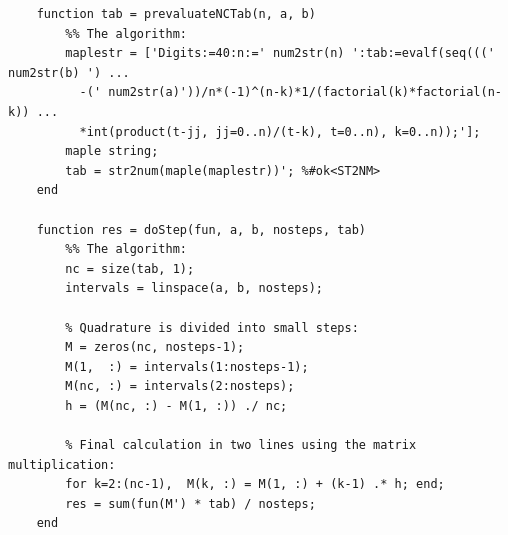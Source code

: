 \documentclass[12pt,twoside,a4paper]{article}
\numberwithin{equation}{subsection}
\numberwithin{figure}{subsection}
\begin{document}
\begin{lstlisting}
	function tab = prevaluateNCTab(n, a, b)
	    %% The algorithm:
	    maplestr = ['Digits:=40:n:=' num2str(n) ':tab:=evalf(seq(((' num2str(b) ') ...
	      -(' num2str(a)'))/n*(-1)^(n-k)*1/(factorial(k)*factorial(n-k)) ...
	      *int(product(t-jj, jj=0..n)/(t-k), t=0..n), k=0..n));'];
	    maple string;
	    tab = str2num(maple(maplestr))'; %#ok<ST2NM>
	end
	
	function res = doStep(fun, a, b, nosteps, tab)
	    %% The algorithm:
	    nc = size(tab, 1);
	    intervals = linspace(a, b, nosteps);
	    
	    % Quadrature is divided into small steps:
	    M = zeros(nc, nosteps-1);
	    M(1,  :) = intervals(1:nosteps-1);
	    M(nc, :) = intervals(2:nosteps);
	    h = (M(nc, :) - M(1, :)) ./ nc;
	    
	    % Final calculation in two lines using the matrix multiplication:
	    for k=2:(nc-1),  M(k, :) = M(1, :) + (k-1) .* h; end;
	    res = sum(fun(M') * tab) / nosteps;
	end
\end{lstlisting}
\end{document}
